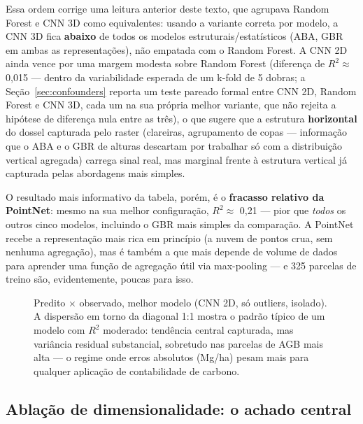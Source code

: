 Essa ordem corrige uma leitura anterior deste texto, que agrupava Random Forest e
CNN 3D como equivalentes: usando a variante correta por modelo, a CNN 3D fica
\textbf{abaixo} de todos os modelos estruturais/estatísticos (ABA, GBR em ambas as
representações), não empatada com o Random Forest. A CNN 2D ainda vence por uma
margem modesta sobre Random Forest (diferença de $R^2 \approx$ 0,015 --- dentro da
variabilidade esperada de um k-fold de 5 dobras; a Seção~\ref{sec:confounders}
reporta um teste pareado formal entre CNN 2D, Random Forest e CNN 3D, cada um na
sua própria melhor variante, que não rejeita a hipótese de diferença nula entre as
três), o que sugere que a estrutura \textbf{horizontal} do dossel capturada pelo
raster (clareiras, agrupamento de copas --- informação que o ABA e o GBR de
alturas descartam por trabalhar só com a distribuição vertical agregada) carrega
sinal real, mas marginal frente à estrutura vertical já capturada pelas abordagens
mais simples.

O resultado mais informativo da tabela, porém, é o \textbf{fracasso relativo da
PointNet}: mesmo na sua melhor configuração, $R^2 \approx$ 0,21 --- pior que
\textit{todos} os outros cinco modelos, incluindo o GBR mais simples da
comparação. A PointNet recebe a representação mais rica em princípio (a nuvem de
pontos crua, sem nenhuma agregação), mas é também a que mais depende de volume de
dados para aprender uma função de agregação útil via max-pooling --- e 325
parcelas de treino são, evidentemente, poucas para isso.

\begin{figure}[H]
  \centering
  \caption{Predito $\times$ observado, melhor modelo (CNN 2D, só outliers,
  isolado). A dispersão em torno da diagonal 1:1 mostra o padrão típico de um
  modelo com $R^2$ moderado: tendência central capturada, mas variância residual
  substancial, sobretudo nas parcelas de AGB mais alta --- o regime onde erros
  absolutos (Mg/ha) pesam mais para qualquer aplicação de contabilidade de
  carbono.}
  \label{fig:pred-obs}
\end{figure}

\subsection{Ablação de dimensionalidade: o achado central}
\label{sec:ablation}

